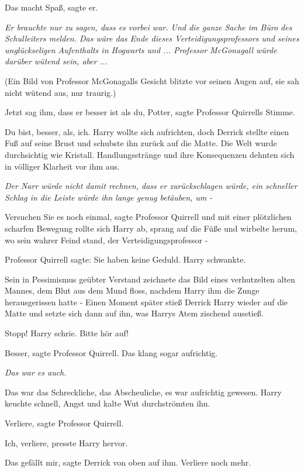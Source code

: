 \glqq{}Das macht Spaß\grqq{}, sagte er.

\emph{Er brauchte nur zu sagen, dass es vorbei war. Und die ganze Sache im Büro
des Schulleiters melden. Das wäre das Ende dieses Verteidigungsprofessors und
seines unglückseligen Aufenthalts in Hogwarts und ... Professor McGonagall würde
darüber wütend sein, aber ...}

(Ein Bild von Professor McGonagalls Gesicht blitzte vor seinen Augen auf, sie
sah nicht wütend aus, nur traurig.)

\glqq{}Jetzt sag ihm, dass er besser ist als du, Potter\grqq{}, sagte Professor
Quirrells Stimme.

\glqq{}Du bist, besser, als, ich.\grqq{} Harry wollte sich aufrichten, doch
Derrick stellte einen Fuß auf seine Brust und schubste ihn zurück auf die Matte.
Die Welt wurde durchsichtig wie Kristall. Handlungsstränge und ihre Konsequenzen
dehnten sich in völliger Klarheit vor ihm aus.

\emph{Der Narr würde nicht damit rechnen, dass er zurückschlagen würde, ein
schneller Schlag in die Leiste würde ihn lange genug betäuben, um -}

\glqq{}Versuchen Sie es noch einmal\grqq{}, sagte Professor Quirrell und mit
einer plötzlichen scharfen Bewegung rollte sich Harry ab, sprang auf die Füße
und wirbelte herum, wo sein wahrer Feind stand, der Verteidigungsprofessor -

Professor Quirrell sagte: \glqq{}Sie haben keine Geduld.\grqq{} Harry schwankte.

Sein in Pessimismus geübter Verstand zeichnete das Bild eines verhutzelten alten
Mannes, dem Blut aus dem Mund floss, nachdem Harry ihm die Zunge herausgerissen
hatte - Einen Moment später stieß Derrick Harry wieder auf die Matte und setzte
sich dann auf ihn, was Harrys Atem zischend ausstieß.

\glqq{}Stopp!\grqq{} Harry schrie. \glqq{}Bitte hör auf!\grqq{}

\glqq{}Besser\grqq{}, sagte Professor Quirrell. \glqq{}Das klang sogar
aufrichtig.\grqq{}

\emph{Das war es auch.}

Das war das Schreckliche, das Abscheuliche, es war aufrichtig gewesen. Harry
keuchte schnell, Angst und kalte Wut durchströmten ihn.

\glqq{}Verliere\grqq{}, sagte Professor Quirrell.

\glqq{}Ich, verliere\grqq{}, presste Harry hervor.

\glqq{}Das gefällt mir\grqq{}, sagte Derrick von oben auf ihm. \glqq{}Verliere
noch mehr.\grqq{}


